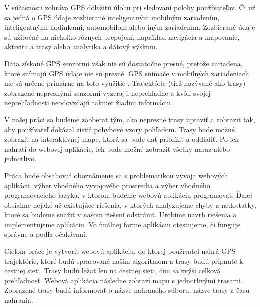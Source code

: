\indent V súčasnosti zohráva GPS dôležitú úlohu pri sledovaní polohy používateľov. Či už sa jedná o GPS údaje zozbierané inteligentným mobilným zariadením, inteligentnými hodinkami, automobilom alebo iným zariadením. Zozbierané údaje sú užitočné na niekoľko rôznych prepojení, napríklad navigácia a mapovanie, aktivita a trasy alebo analytika a dátový výskum. 


Dáta získané GPS senzormi však nie sú dostatočne presné, pretože zariadena, ktoré snímajú GPS údaje nie sú presné. GPS snímače v mobilných zariadeniach nie sú určené primárne na toto využitie \cite{993780}. Trajektórie (tiež nazývané ako trasy) zobrazené nepresnými senzormi vyzerajú neprehľadne a kvôli svojej neprehľadnosti neodovzdajú takmer žiadnu informáciu. 

V našej práci sa budeme zaoberať tým, ako nepresné trasy upraviť a zobraziť tak, aby používateľ dokázal zistiť pohybové vzory pohľadom. Trasy bude možné zobraziť na interaktívnej mape, ktorá sa bude dať priblížiť a oddialiť. Po ich nahratí do webovej aplikácie, ich bude možné zobraziť všetky naraz alebo jednotlivo.

Práca bude obsahovať oboznámenie sa s problematikou vývoja webových aplikácii, výber vhodného vyvojového prostredia a výber vhodného programovacieho jazyka, v ktorom budeme webovú aplikáciu programovať. Ďalej obsiahne nejaké už existujúce riešenia, v ktorých analyzujeme chyby a nedostatky, ktoré sa budeme snažiť v našom riešení odstrániť. Urobíme návrh riešenia a implementujeme aplikáciu. Vo finálnej forme aplikáciu otestujeme, či funguje správne a podľa očakávaní.

Cieľom práce je vytvoriť webovú aplikáciu, do ktorej používateľ nahrá GPS trajektórie, ktoré budú spracované naším algoritmom a trasy budú pripnuté k cestnej sieti. Trasy budú ležať len na cestnej sieti, čím sa zvýši celková prehľadnosť. Webová aplikácia následne zobrazí mapu s jednotlivými trasami. Zobrazené trasy budú informovať o názve nahraného súboru, názve trasy a času nahrania.
